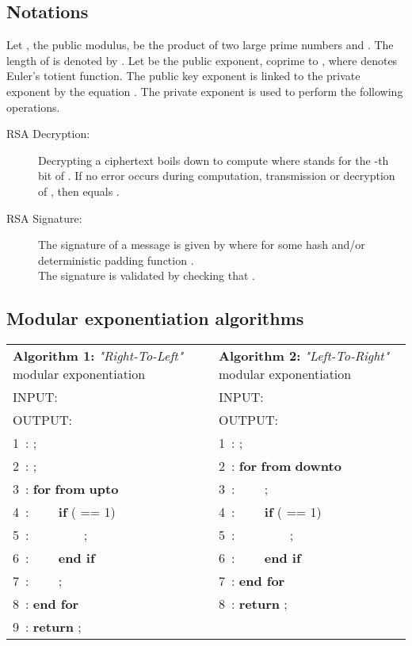 \documentclass{article}
\begin{document}
\subsection{Notations}
Let , the public modulus, be the product of two large prime numbers
 and . The length of  is denoted by . Let  be the
public exponent, coprime to , where
 denotes Euler's totient function. The public key
exponent  is linked to the private exponent  by the equation 
. The private exponent  is
used to perform the following operations.
\begin{description}
 \item[RSA Decryption: ]Decrypting a ciphertext  boils down to compute  where  stands for the -th bit of .
 If no error occurs during computation, transmission or decryption of , then  equals .
 \item[RSA Signature: ]The signature of a message  is given by 
		       where  for some hash and/or deterministic padding function .\\
		       The signature  is validated by checking that .
\end{description}

\subsection{Modular exponentiation algorithms}
\begin{table}[ht]
\label{tab:l2r}
\begin{center}
\begin{tabular}{p{5.7cm}p{0.5cm}p{5.7cm}}
\cline{1-1} \cline{3-3}
\textbf{Algorithm 1:} \textit{"Right-To-Left"} modular exponentiation 
& &
\textbf{Algorithm 2:} \textit{"Left-To-Right"} modular exponentiation
\\
\cline{1-1} \cline{3-3} INPUT:  & & INPUT:  \\
OUTPUT:  & & OUTPUT:  \\
\cline{1-1} \cline{3-3} 1~: ; & & 1~: ;\\
2~: ; & & 2~: \textbf{for}  \textbf{from}  \textbf{downto} \\
3~: \textbf{for}  \textbf{from}  \textbf{upto}  & & 3~: ~~~~;\\
4~: ~~~~\textbf{if} ( == 1) & & 4~: ~~~~\textbf{if} ( == 1)\\
5~: ~~~~~~~~; & & 5~: ~~~~~~~~;\\
6~: ~~~~\textbf{end if} & & 6~: ~~~~\textbf{end if}\\
7~: ~~~~; & & 7~: \textbf{end for}\\
8~: \textbf{end for} & & 8~: \textbf{return} ;\\
9~: \textbf{return} ;\\
\cline{1-1} \cline{3-3} 
\end{tabular}
\end{center}
\end{table}
\end{document}
